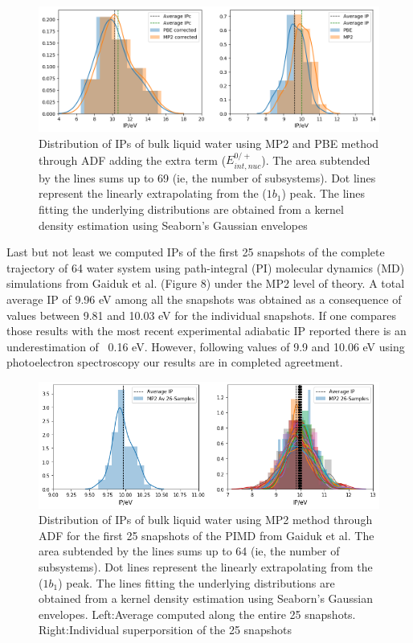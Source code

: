 \documentclass[12pt,a4paper]{article}
\begin{document}
\begin{figure}[!ht]
        \centering
        \includegraphics[width=\linewidth]{69-mp2-pbe-C}
        \caption{Distribution of IPs of bulk liquid water using MP2 and PBE method through ADF \cite{te2001chemistry} adding the extra term ($E_{int,nuc}^{0/+}$). The area subtended by the lines sums up to 69 (ie, the number of subsystems). Dot lines represent the linearly extrapolating from the ($1b_{1}$) peak. The lines fitting the underlying distributions are obtained from a kernel density estimation using Seaborn's Gaussian envelopes\cite{waskom2017c}}
\end{figure}

Last but not least we computed IPs of the first 25 snapshots of the complete trajectory of 64 water system using path-integral (PI) molecular
dynamics (MD) simulations from Gaiduk et al. \cite{gaiduk2018electron} (Figure 8) under the MP2 level of theory.
A total average IP of 9.96 eV among all the snapshots was obtained as a consequence of values between 9.81 and 10.03 eV
for the individual snapshots. If one compares those results with the most recent experimental adiabatic IP reported 
\cite{perry2020ionization} there is an underestimation of ~0.16 eV. 
However, following values of 9.9 \cite{winter2004full}and 10.06 eV \cite{kurahashi2014photoelectron} using photoelectron spectroscopy
our results are in completed agreetment.

\begin{figure}[!ht]
        \centering
        \includegraphics[width=\linewidth]{snapshotsgg}
        \caption{Distribution of IPs of bulk liquid water using MP2 method through ADF \cite{te2001chemistry} for the first 25 snapshots of the PIMD from Gaiduk et al. The area subtended by the lines sums up to 64 (ie, the number of subsystems). Dot lines represent the linearly extrapolating from the ($1b_{1}$) peak. The lines fitting the underlying distributions are obtained from a kernel density estimation using Seaborn's Gaussian envelopes\cite{waskom2017c}. Left:Average computed along the entire 25 snapshots. Right:Individual superporsition of the 25 snapshots}
\end{figure}
\end{document}
